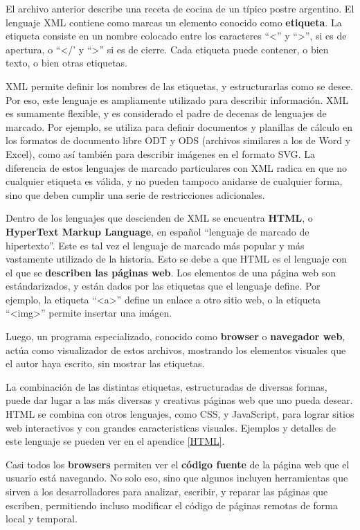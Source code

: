 El archivo anterior describe una receta de cocina de un típico postre argentino.
El lenguaje XML contiene como marcas un elemento conocido como \textbf{etiqueta}.
La etiqueta consiste en un nombre colocado entre los caracteres ``<'' y ``>'',
si es de apertura, o ``</' y ``>'' si es de cierre. Cada etiqueta puede contener,
o bien texto, o bien otras etiquetas.

XML permite definir los nombres de las etiquetas, y estructurarlas como se desee.
Por eso, este lenguaje es ampliamente utilizado para describir información.
XML es sumamente flexible, y es considerado el padre de decenas de lenguajes de
marcado. Por ejemplo, se utiliza para definir documentos y planillas de cálculo
en los formatos de documento libre ODT y ODS (archivos similares a los de Word y
Excel), como así también para describir imágenes en el formato SVG. La diferencia
de estos lenguajes de marcado particulares con XML radica en que no cualquier
etiqueta es válida, y no pueden tampoco anidarse de cualquier forma, sino que
deben cumplir una serie de restricciones adicionales.

Dentro de los lenguajes que descienden de XML se encuentra \textbf{HTML}, o
\textbf{HyperText Markup Language}, en español ``lenguaje de marcado de hipertexto''.
Este es tal vez el lenguaje de marcado más popular y más vastamente utilizado de
la historia. Esto se debe a que HTML es el lenguaje con el que se \textbf{describen
las páginas web}. Los elementos de una página web son estándarizados, y están
dados por las etiquetas que el lenguaje define. Por ejemplo, la etiqueta
``<a>'' define un enlace a otro sitio web, o la etiqueta ``<img>'' permite insertar
una imágen.

Luego, un programa especializado, conocido como \textbf{browser} o \textbf{navegador
web}, actúa como visualizador de estos archivos, mostrando los elementos visuales
que el autor haya escrito, sin mostrar las etiquetas.

La combinación de las distintas etiquetas, estructuradas de diversas formas,
puede dar lugar a las más diversas y creativas páginas web que uno pueda desear.
HTML se combina con otros lenguajes, como CSS, y JavaScript, para lograr sitios
web interactivos y con grandes caracteristicas visuales. Ejemplos y detalles de
este lenguaje se pueden ver en el apendice \ref{HTML}.

\begin{knowwhat}
    Casi todos los \textbf{browsers} permiten ver el \textbf{código fuente} de
    la página web que el usuario está navegando. No solo eso, sino que algunos
    incluyen herramientas que sirven a los desarrolladores para analizar, escribir,
    y reparar las páginas que escriben, permitiendo incluso modificar el código
    de páginas remotas de forma local y temporal.
\end{knowwhat}

